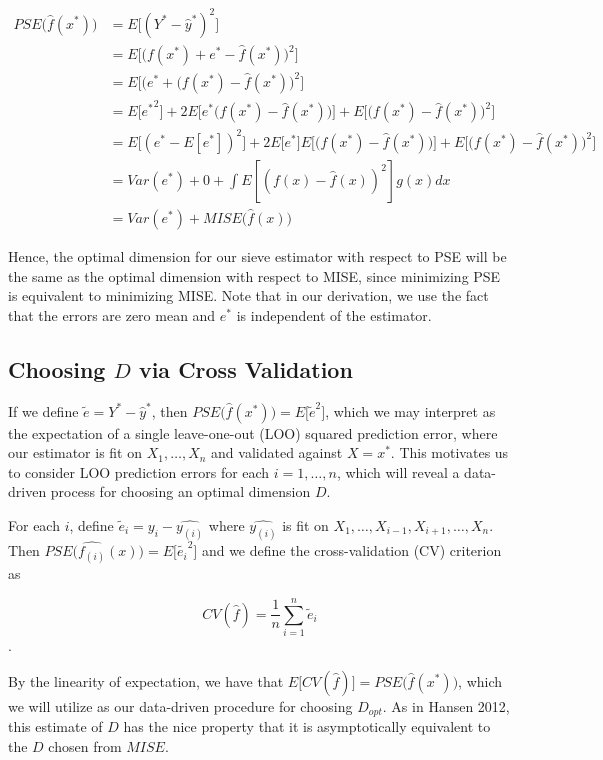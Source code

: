 \documentclass[12pt]{article}  %
\begin{document}
\begin{align*}
PSE\Big(\hat{f}(x^*)\Big) &= E\Big[(Y^* - \hat{y}^*)^2\Big] \\
&= E\Big[\Big(f(x^*) + e^* - \hat{f}(x^*)\Big)^2\Big] \\
&= E\Big[\Big(e^* + (f(x^*) - \hat{f}(x^*)\Big)^2\Big] \\
&= E\big[{e^*}^2\big] + 2E\Big[e^*\Big(f(x^*) - \hat{f}(x^*)\Big)\Big] + E\Big[\Big(f(x^*) - \hat{f}(x^*)\Big)^2\Big] \\
&= E\Big[{(e^* - E[e^*])}^2\Big] + 2E\big[e^*\big]E\Big[\Big(f(x^*) - \hat{f}(x^*)\Big)\Big] + E\Big[\Big(f(x^*) - \hat{f}(x^*)\Big)^2\Big] \\
&= Var(e^*) + 0 + \int E[(f(x) - \hat{f}(x))^2]g(x)dx \\
& = Var(e^*) + MISE\Big(\hat{f}(x)\Big)
\end{align*}

Hence, the optimal dimension for our sieve estimator with respect to PSE will be the same as the optimal dimension with respect to MISE, since minimizing PSE is equivalent to minimizing MISE. Note that in our derivation, we use the fact that the errors are zero mean and $e^*$ is independent of the estimator. 

\subsection{Choosing $D$ via Cross Validation}

If we define $\tilde{e} = Y^* - \hat{y}^*$, then $PSE\Big(\hat{f}(x^*)\Big) = E\big[\tilde{e}^2\big]$, which we may interpret as the expectation of a single leave-one-out (LOO) squared prediction error, where our estimator is fit on $X_1, \ldots, X_n$ and validated against $X = x^*$. This motivates us to consider LOO prediction errors for each $i = 1, \ldots, n$, which will reveal a data-driven process for choosing an optimal dimension $D$.

For each $i$, define $\tilde{e}_i = y_i - \hat{y_{(i)}}$ where $\hat{y_{(i)}}$ is fit on $X_1, \ldots, X_{i-1}, X_{i+1}, \ldots, X_n$. Then $PSE\Big(\hat{f_{(i)}}(x)\Big) = E\big[\tilde{e_i}^2\big]$ and we define the cross-validation (CV) criterion as

$$CV(\hat{f}) = \frac{1}{n}\sum_{i=1}^n \tilde{e}_i$$.

By the linearity of expectation, we have that $E\Big[CV(\hat{f})\Big] = PSE\Big(\hat{f}(x^*)\Big)$, which we will utilize as our data-driven procedure for choosing $D_{opt}$. As in Hansen 2012, this estimate of $D$ has the nice property that it is asymptotically equivalent to the $D$ chosen from $MISE$.
\end{document}

